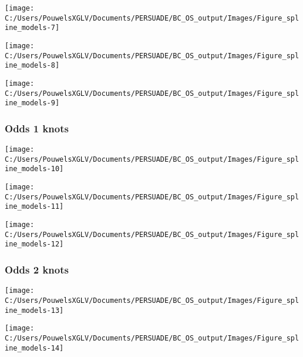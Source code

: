 \documentclass[
]{article}
\begin{document}
\begin{flushleft}\texttt{[image: C:/Users/PouwelsXGLV/Documents/PERSUADE/BC\_OS\_output/Images/Figure\_spline\_models-7]} \end{flushleft}

\begin{flushleft}\texttt{[image: C:/Users/PouwelsXGLV/Documents/PERSUADE/BC\_OS\_output/Images/Figure\_spline\_models-8]} \end{flushleft}

\begin{flushleft}\texttt{[image: C:/Users/PouwelsXGLV/Documents/PERSUADE/BC\_OS\_output/Images/Figure\_spline\_models-9]} \end{flushleft}

\clearpage

\subsubsection{Odds 1 knots}\label{odds-1-knots}

\begin{flushleft}\texttt{[image: C:/Users/PouwelsXGLV/Documents/PERSUADE/BC\_OS\_output/Images/Figure\_spline\_models-10]} \end{flushleft}

\begin{flushleft}\texttt{[image: C:/Users/PouwelsXGLV/Documents/PERSUADE/BC\_OS\_output/Images/Figure\_spline\_models-11]} \end{flushleft}

\begin{flushleft}\texttt{[image: C:/Users/PouwelsXGLV/Documents/PERSUADE/BC\_OS\_output/Images/Figure\_spline\_models-12]} \end{flushleft}

\clearpage

\subsubsection{Odds 2 knots}\label{odds-2-knots}

\begin{flushleft}\texttt{[image: C:/Users/PouwelsXGLV/Documents/PERSUADE/BC\_OS\_output/Images/Figure\_spline\_models-13]} \end{flushleft}

\begin{flushleft}\texttt{[image: C:/Users/PouwelsXGLV/Documents/PERSUADE/BC\_OS\_output/Images/Figure\_spline\_models-14]} \end{flushleft}
\end{document}
